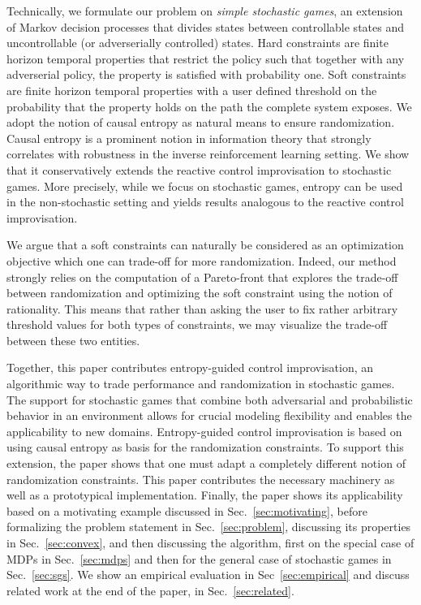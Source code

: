 Technically, we formulate our problem on \emph{simple stochastic games}, an extension of Markov decision processes that divides states between controllable states and uncontrollable (or adverserially controlled) states. Hard constraints are finite horizon temporal properties that restrict the policy such that together with any adverserial policy, the property is satisfied with probability one. Soft constraints are finite horizon temporal properties with a user defined threshold on the probability that the property holds on the path the complete system exposes. 
We adopt the notion of causal entropy as natural means to ensure randomization. Causal entropy is a prominent notion in information theory that strongly correlates with robustness in the inverse reinforcement learning setting. We show that it conservatively extends the reactive control improvisation to stochastic games. More precisely,  while we focus on stochastic games, entropy can be used in the non-stochastic setting and yields results analogous to the reactive control improvisation. 

We argue that a soft constraints can naturally be considered as an optimization objective which one can trade-off for more randomization. 
Indeed, our method strongly relies on the computation of a Pareto-front that explores the trade-off between randomization and optimizing the soft constraint using the notion of rationality. This means that rather than asking the user to  fix rather arbitrary threshold values for both types of constraints, we may visualize the trade-off between these two entities.  

Together, this paper contributes entropy-guided control improvisation, an algorithmic way to trade performance and randomization in stochastic games. 
The support for stochastic games that combine both adversarial and probabilistic behavior in an environment allows for crucial modeling flexibility and enables the applicability to new domains. 
Entropy-guided control improvisation is based on using causal entropy as basis for the randomization constraints.
To support this extension, the paper shows that one must adapt a completely different notion of randomization constraints. This paper contributes the necessary machinery as well as a prototypical implementation.
Finally, the paper shows its applicability based on a motivating example discussed in Sec.~\ref{sec:motivating}, before formalizing the problem statement in Sec.~\ref{sec:problem}, discussing its properties in Sec.~\ref{sec:convex}, and then discussing the algorithm, first on the special case of MDPs in Sec.~\ref{sec:mdps} and then for the general case of stochastic games in Sec.~\ref{sec:sgs}. 
We show an empirical evaluation in Sec~\ref{sec:empirical} and discuss related work at the end of the paper, in Sec.~\ref{sec:related}.



